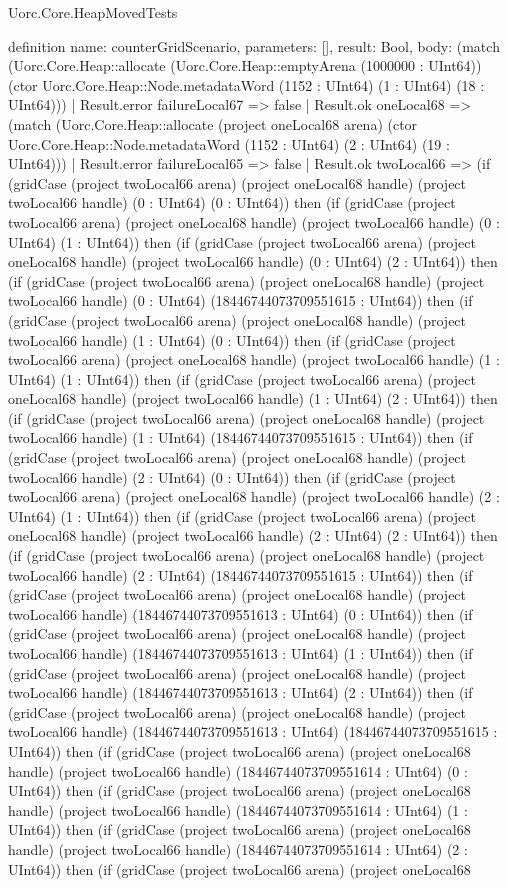 \begin{lexlean}{Uorc.Core.HeapMovedTests}
\begin{semanticmodule}
definition{
  name: counterGridScenario,
  parameters: [],
  result: Bool,
  body: (match (Uorc.Core.Heap::allocate (Uorc.Core.Heap::emptyArena (1000000 : UInt64)) (ctor Uorc.Core.Heap::Node.metadataWord (1152 : UInt64) (1 : UInt64) (18 : UInt64)))
    | Result.error failureLocal67 => false
    | Result.ok oneLocal68 => (match (Uorc.Core.Heap::allocate (project oneLocal68 arena) (ctor Uorc.Core.Heap::Node.metadataWord (1152 : UInt64) (2 : UInt64) (19 : UInt64)))
      | Result.error failureLocal65 => false
      | Result.ok twoLocal66 => (if (gridCase (project twoLocal66 arena) (project oneLocal68 handle) (project twoLocal66 handle) (0 : UInt64) (0 : UInt64)) then (if (gridCase (project twoLocal66 arena) (project oneLocal68 handle) (project twoLocal66 handle) (0 : UInt64) (1 : UInt64)) then (if (gridCase (project twoLocal66 arena) (project oneLocal68 handle) (project twoLocal66 handle) (0 : UInt64) (2 : UInt64)) then (if (gridCase (project twoLocal66 arena) (project oneLocal68 handle) (project twoLocal66 handle) (0 : UInt64) (18446744073709551615 : UInt64)) then (if (gridCase (project twoLocal66 arena) (project oneLocal68 handle) (project twoLocal66 handle) (1 : UInt64) (0 : UInt64)) then (if (gridCase (project twoLocal66 arena) (project oneLocal68 handle) (project twoLocal66 handle) (1 : UInt64) (1 : UInt64)) then (if (gridCase (project twoLocal66 arena) (project oneLocal68 handle) (project twoLocal66 handle) (1 : UInt64) (2 : UInt64)) then (if (gridCase (project twoLocal66 arena) (project oneLocal68 handle) (project twoLocal66 handle) (1 : UInt64) (18446744073709551615 : UInt64)) then (if (gridCase (project twoLocal66 arena) (project oneLocal68 handle) (project twoLocal66 handle) (2 : UInt64) (0 : UInt64)) then (if (gridCase (project twoLocal66 arena) (project oneLocal68 handle) (project twoLocal66 handle) (2 : UInt64) (1 : UInt64)) then (if (gridCase (project twoLocal66 arena) (project oneLocal68 handle) (project twoLocal66 handle) (2 : UInt64) (2 : UInt64)) then (if (gridCase (project twoLocal66 arena) (project oneLocal68 handle) (project twoLocal66 handle) (2 : UInt64) (18446744073709551615 : UInt64)) then (if (gridCase (project twoLocal66 arena) (project oneLocal68 handle) (project twoLocal66 handle) (18446744073709551613 : UInt64) (0 : UInt64)) then (if (gridCase (project twoLocal66 arena) (project oneLocal68 handle) (project twoLocal66 handle) (18446744073709551613 : UInt64) (1 : UInt64)) then (if (gridCase (project twoLocal66 arena) (project oneLocal68 handle) (project twoLocal66 handle) (18446744073709551613 : UInt64) (2 : UInt64)) then (if (gridCase (project twoLocal66 arena) (project oneLocal68 handle) (project twoLocal66 handle) (18446744073709551613 : UInt64) (18446744073709551615 : UInt64)) then (if (gridCase (project twoLocal66 arena) (project oneLocal68 handle) (project twoLocal66 handle) (18446744073709551614 : UInt64) (0 : UInt64)) then (if (gridCase (project twoLocal66 arena) (project oneLocal68 handle) (project twoLocal66 handle) (18446744073709551614 : UInt64) (1 : UInt64)) then (if (gridCase (project twoLocal66 arena) (project oneLocal68 handle) (project twoLocal66 handle) (18446744073709551614 : UInt64) (2 : UInt64)) then (if (gridCase (project twoLocal66 arena) (project oneLocal68 }
\end{semanticmodule}
\end{lexlean}

